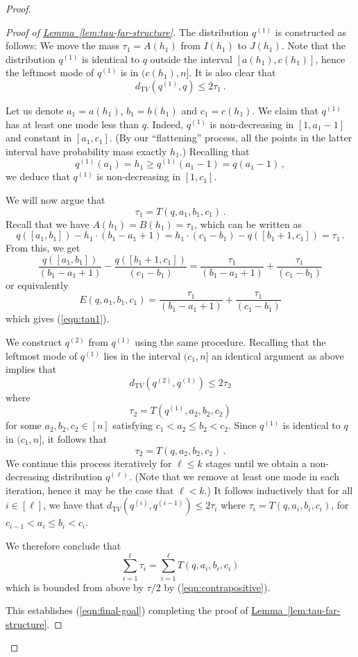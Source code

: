 \documentclass[10pt]{article}
\theoremstyle{definition}
\numberwithin{equation}{section}
\newcommand{\expref}[2]{\texorpdfstring{\hyperref[#2]{#1~\ref{#2}}}{#1~\ref{#2}}}
\newcommand{\dtv}{d_{\mathrm TV}}
\begin{document}
\begin{proof}
\begin{proof}[Proof of \expref{Lemma}{lem:tau-far-structure}]
The distribution $q^{(1)}$ is constructed as follows: We move the
mass $\tau_1 = A(h_{{1}})$ from $I(h_{{1}})$ to $J(h_{{1}})$.
{Note that the distribution $q^{(1)}$ is identical to $q$ outside the interval $[a(h_1), c(h_1)]$, hence the leftmost
mode of $q^{(1)}$ is in $(c(h_{{1}}) , n]$. 
It is also clear that $$\dtv(q^{(1)}, q) \leq 2\tau_1\,.$$} 

{Let us denote $a_1= a(h_1)$, $b_1= b(h_1)$ and $c_1= c(h_1)$.}
We claim that $q^{(1)}$ has at least one mode less than $q$. Indeed,
$q^{(1)}$ is non-decreasing in $[1, a_1-1]$ and constant in $[a_1,c_1]$.
(By our ``flattening'' process, all the points in the latter interval have probability mass exactly $h_{{1}}$.)
Recalling that {$$q^{(1)}(a_1) = h_{{1}} \geq q^{(1)}(a_1-1) = q(a_1-1)\,,$$}
we deduce that $q^{(1)}$ is non-decreasing in $[1,{c_1}]$.

We will now argue that
\begin{equation} \label{eqn:tau1}
\tau_1 =  T(q, a_1, b_1, c_1)\,.
\end{equation}
Recall that we have $A(h_{{1}})  = B(h_{{1}}) = {\tau_1}$, which can be written as
\[
q([a_1, b_1])  - h_1 \cdot (b_1-a_1+1)  = h_1 \cdot (c_1-b_1)  - q([b_1+1,c_1]) = \tau_1\,.
\]
{}From this, we get
\[
\frac{q([a_1,b_1])}{(b_1-a_1+1)}  - \frac{q([b_1+1,c_1])}{(c_1-b_1)}
= \frac{\tau_1}{(b_1-a_1+1)} + \frac{\tau_1}{(c_1-b_1)}
\]
or equivalently
\[
E\left(q, a_1, b_1, c_1 \right) = \frac{\tau_1}{(b_1-a_1+1)} + \frac{\tau_1}{(c_1-b_1)}
\]
which gives (\ref{eqn:tau1}).

{We construct $q^{(2)}$ from $q^{(1)}$ using the same procedure. 
Recalling that the leftmost mode  of $q^{(1)}$ lies in the interval $(c_1 , n]$ 
an identical argument as above implies that
$$\dtv(q^{(2)}, q^{(1)}) \leq 2\tau_2$$
where 
$$\tau_2 =  T(q^{(1)}, a_2, b_2, c_2)$$ 
for some $a_2, b_2, c_2\in [n]$ satisfying $c_1 < a_2 \le b_2 < c_2$. Since $q^{(1)}$
is identical to $q$ in $(c_1, n]$, it follows that 
$$\tau_2 =  T(q, a_2, b_2, c_2)\,.$$ 
{We continue this process iteratively for $\ell \le k$ stages until we obtain a non-decreasing distribution $q^{(\ell)}$.
(Note that we remove at least one mode in each iteration, hence it may be the case that $\ell < k$.)}
It follows inductively that for all $i \in [\ell]$, we have that $\dtv(q^{(i)}, q^{(i-1)}) \leq 2\tau_i$
where $\tau_i =  T(q, a_i, b_i, c_i)$, for $c_{i-1} < a_{i} \le b_{i} < c_{i}$.

We therefore conclude that $$\sum_{i=1}^{\ell} \tau_i = \sum_{i=1}^{\ell} T(q, a_i, b_i, c_i)$$ which is bounded from above by 
$\tau/2$ by (\ref{eqn:contrapositive}).
}
This establishes (\ref{eqn:final-goal}) 
completing the proof of \expref{Lemma}{lem:tau-far-structure}.
\end{proof}


\end{proof}
\end{document}
